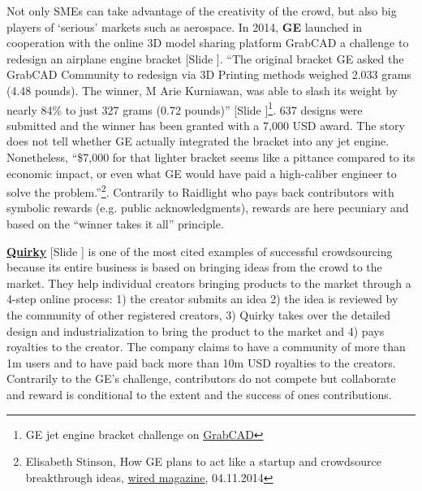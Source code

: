 \documentclass{article}
\newcounter{slide}
\begin{document}
Not only SMEs can take advantage of the creativity of the crowd, but also big players of `serious' markets such as aerospace. In 2014, \textbf{GE} launched in cooperation with the online 3D model sharing platform GrabCAD a challenge to redesign an airplane engine bracket {\color{blue} [Slide ]}. ``The original bracket GE asked the GrabCAD Community to redesign via 3D Printing methods weighed 2.033 grams (4.48 pounds). The winner, M Arie Kurniawan, was able to slash its weight by nearly 84\% to just 327 grams (0.72 pounds)''{\color{blue} [Slide ]}\footnote{GE jet engine bracket challenge on \href{https://grabcad.com/challenges/ge-jet-engine-bracket-challenge}{GrabCAD}}. 637 designs were submitted and the winner has been granted with a 7,000 USD award. The story does not tell whether GE actually integrated the bracket into any jet engine. Nonetheless, ``\$7,000 for that lighter bracket seems like a pittance compared to its economic impact, or even what GE would have paid a high-caliber engineer to solve the problem.''\footnote{Elisabeth Stinson, How GE plans to act like a startup and crowdsource breakthrough ideas, \href{https://www.wired.com/2014/04/how-ge-plans-to-act-like-a-startup-and-crowdsource-great-ideas/}{wired magazine}, 04.11.2014}. Contrarily to Raidlight who pays back contributors with symbolic rewards (e.g. public acknowledgments), rewards are here pecuniary and based on the ``winner takes it all'' principle.

\textbf{\href{https://quirky.com}{Quirky}} {\color{blue}[Slide ]} is one of the most cited examples of successful crowdsourcing because its entire business is based on bringing ideas from the crowd to the market. They help individual creators bringing products to the market through a 4-step online process: 1) the creator submits an idea 2) the idea is reviewed by the community of other registered creators, 3) Quirky takes over the detailed design and industrialization to bring the product to the market and 4) pays royalties to the creator. The company claims to have a community of more than 1m users and to have  paid back more than 10m USD royalties to the creators. Contrarily to the GE's challenge, contributors do not compete but collaborate and reward is conditional to the extent and the success of ones contributions. 
\begin{comment} 
https://www.emeraldinsight.com/doi/pdfplus/10.1108/JBS-10-2016-0120
\end{comment}
\end{document}
